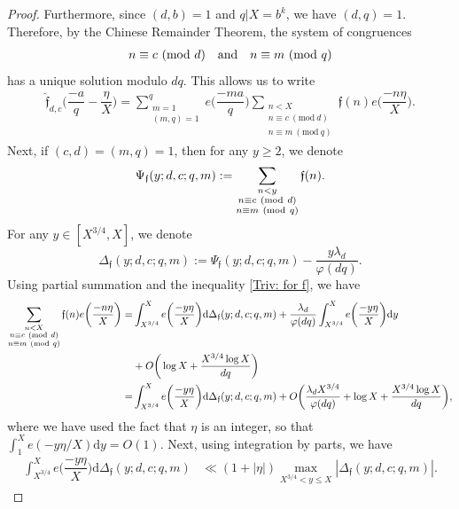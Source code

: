 \documentclass[12pt]{amsart}
\numberwithin{equation}{section}
\theoremstyle{remark}
\theoremstyle{definition}
\newcommand{\imod}[1]{\ (\mathrm{mod}\ #1)}
\begin{document}
\begin{proof}
Furthermore, since $(d, b)=1$ and $q|X=b^k$, we have $(d, q)=1$. Therefore, by the Chinese Remainder Theorem, the system of congruences 
\begin{align}
\notag n\equiv c\imod d \quad \text{and}\quad  n\equiv m\imod q
\end{align}
has a unique solution modulo $dq$. This allows us to write
\begin{align}
\label{inner}\widehat{\mathfrak{f}}_{d, c}\bigg(\dfrac{-a}{q}-\dfrac{\eta}{X}\bigg)=\sum_{\substack{m=1\\(m,q)=1}}^qe\bigg(\dfrac{-ma}{q}\bigg)\sum_{\substack{n<X\\n\equiv c \imod{d}\\n\equiv m\imod q}}\mathfrak{f}(n)e\bigg(\dfrac{-n \eta }{X}\bigg).
\end{align}
Next, if $(c, d)=(m, q)=1$, then for any $y\geq 2$, we denote
\begin{align}
\notag \Psi_{\mathfrak{f}}(y; d, c; q, m):=\sum_{\substack{n<y\\n\equiv c\imod {d}\\n\equiv m\imod q}}\mathfrak{f}(n).
\end{align} 
For any $y\in [X^{3/4}, X]$, we denote 
\[\Delta_{\mathfrak{f}}(y; d, c; q, m):=\Psi_{\mathfrak{f}}(y; d, c; q, m)-\frac{ y\lambda_{d}}{\varphi(dq)}.\]
Using partial summation and the inequality \eqref{Triv: for f}, we have
\begin{align}
\notag \sum_{\substack{n<X\\n\equiv c \imod{d}\\n\equiv m\imod q}}\mathfrak{f}(n)e\bigg(\dfrac{-n \eta }{X}\bigg)=& \int_{X^{3/4}}^X e\bigg(\dfrac{-y\eta}{X}\bigg)\text{d}\Delta_{\mathfrak{f}}(y; d, c; q, m)
+ \dfrac{\lambda_{d}}{\varphi(dq)}\int_{X^{3/4}}^X e\bigg(\dfrac{-y\eta}{X}\bigg)\text{d}y\\
\notag &+ O\bigg(\log X + \dfrac{X^{3/4}\log X}{dq}\bigg)\\
\label{inner01}  =& \int_{X^{3/4}}^X e\bigg(\dfrac{-y\eta}{X}\bigg)\text{d}\Delta_{\mathfrak{f}}(y; d, c; q, m) + O\bigg(\dfrac{\lambda_{d}X^{3/4}}{\varphi(dq)} + \log X + \dfrac{X^{3/4}\log X}{dq}\bigg),
\end{align}
where we have used the fact that $\eta$ is an integer, so that $\int_{1}^X e(-y\eta/X)\text{d}y=O(1)$. Next, using integration by parts, we have
\begin{align}
\label{inner02}\int_{X^{3/4}}^X e\bigg(\dfrac{-y\eta}{X}\bigg)\text{d}\Delta_{\mathfrak{f}}(y; d, c; q, m) &\ll (1+|\eta|)\max_{X^{3/4}<y\leq X}|\Delta_{\mathfrak{f}}(y; d, c; q, m)|.

\end{align}
\end{proof}
\end{document}
